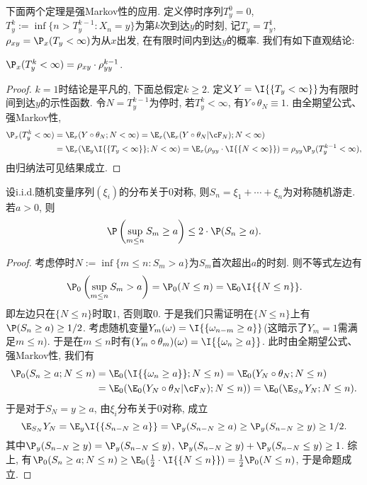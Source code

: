 \documentclass[a4paper, 10pt]{ctexart}
\begin{document}
下面两个定理是强Markov性的应用. 
定义停时序列$T_y^0 = 0$, $T_y^k := \inf\{n > T_y^{k-1} \colon X_n = y\}$为第$k$次到达$y$的时刻, 记$T_y = T_y^1$, $\rho_{xy} = \P_x(T_y < \infty)$为从$x$出发, 在有限时间内到达$y$的概率. 
我们有如下直观结论: 
\begin{theorem}\label{thm:MultipleOfHittingTime}
	$\P_x(T_y^k < \infty) = \rho_{xy} \cdot \rho_{yy}^{k-1}$. 
\end{theorem}
\begin{proof}
	$k = 1$时结论是平凡的, 下面总假定$k \geq 2$. 
	定义$Y = \I{\{T_y < \infty\}} $为有限时间到达$y$的示性函数.  
	令$N = T_y^{k-1}$为停时, 若$T_y^k < \infty$, 有$Y \circ \theta_N \equiv 1$. 
	由全期望公式、强Markov性, 
	\begin{align*}
		\P_x(T_y^k < \infty)
		&= \E_x(Y \circ \theta_N; N < \infty)
		= \E_x(\E_x(Y \circ \theta_N | \cF_N); N < \infty) \\
		&= \E_x(\E_{y} \I{\{T_y < \infty\}} ; N < \infty)
		= \E_x(\rho_{yy} \cdot \I{\{N < \infty\}})
		= \rho_{yy} \P_y(T_y^{k-1} < \infty), 
	\end{align*}
	由归纳法可见结果成立. 
\end{proof}

\begin{theorem}[反射原理]
	设i.i.d.随机变量序列$(\xi_i)$的分布关于$0$对称, 则$S_n = \xi_1 + \cdots + \xi_n$为对称随机游走. 
	若$a > 0$, 则
	\begin{equation*}
		\P \left(\sup_{m \leq n} S_m \geq a \right) \leq 2 \cdot \P(S_n \geq a). 
	\end{equation*}
\end{theorem}
\begin{proof}
	考虑停时$N := \inf\{m \leq n \colon S_m > a\}$为$S_m$首次超出$a$的时刻. 
	则不等式左边有
	\begin{equation*}
		\P_0 \left( \sup_{m \leq n} S_m > a \right)
		= \P_0 (N \leq n)
		= \E_0 \I{\{N \leq n\}}. 
	\end{equation*}
	即左边只在$\{N \leq n\}$时取$1$, 否则取$0$. 
	于是我们只需证明在$\{N \leq n\}$上有$\P(S_n \geq a) \geq 1/2$. 
	考虑随机变量$Y_m(\omega) = \I{\{\omega_{n - m} \geq a\}}$(这暗示了$Y_m = 1$需满足$m \leq n$). 
	于是在$m \leq n$时有$(Y_m \circ \theta_m)(\omega) = \I{\{\omega_n \geq a\}}$. 
	此时由全期望公式、强Markov性, 我们有
	\begin{align*}
		\P_0(S_n \geq a ; N \leq n)
		&= \E_0 ( \I{\{\omega_n \geq a\}} ; N \leq n)
		= \E_0 (Y_N \circ \theta_N; N \leq n) \\
		&= \E_0(\E_0(Y_N \circ \theta_N | \cF_N); N \leq n)) 
		= \E_0(\E_{S_N} Y_N; N \leq n). 
	\end{align*}
	于是对于$S_N  = y \geq a$, 由$\xi_i$分布关于$0$对称, 成立
	\begin{equation*}
		\E_{S_N} Y_N 
		= \E_y \I{\{S_{n - N} \geq a\}}
		= \P_y (S_{n - N} \geq a)
		\geq \P_y (S_{n - N} \geq y)
		\geq 1/2. 
	\end{equation*}
	其中$\P_y (S_{n - N} \geq y) = \P_y (S_{n - N} \leq y)$, $\P_y (S_{n - N} \geq y) + \P_y (S_{n - N} \leq y) \geq 1$. 
	综上, 有$\P_0(S_n \geq a ; N \leq n) \geq \E_0( \frac12 \cdot \I{\{N \leq n\}}) = \frac12 \P_0(N \leq n)$, 于是命题成立. 
\end{proof}
\end{document}
